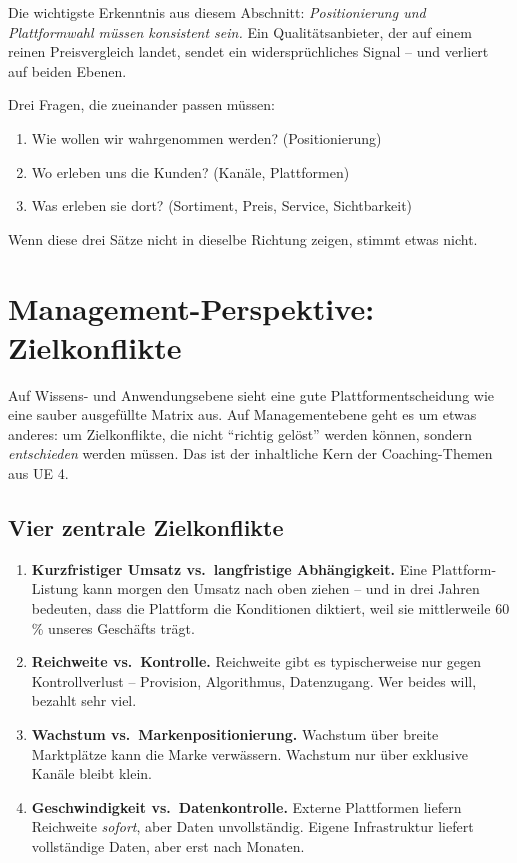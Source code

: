 \documentclass[11pt,a4paper,oneside]{article}
\begin{document}
Die wichtigste Erkenntnis aus diesem Abschnitt: \emph{Positionierung und Plattformwahl müssen konsistent sein.} Ein Qualitätsanbieter, der auf einem reinen Preisvergleich landet, sendet ein widersprüchliches Signal -- und verliert auf beiden Ebenen.

\begin{merkbox}
Drei Fragen, die zueinander passen müssen:
\begin{enumerate}
  \item Wie wollen wir wahrgenommen werden? (Positionierung)
  \item Wo erleben uns die Kunden? (Kanäle, Plattformen)
  \item Was erleben sie dort? (Sortiment, Preis, Service, Sichtbarkeit)
\end{enumerate}
Wenn diese drei Sätze nicht in dieselbe Richtung zeigen, stimmt etwas nicht.
\end{merkbox}

\section{Management-Perspektive: Zielkonflikte}

Auf Wissens- und Anwendungsebene sieht eine gute Plattformentscheidung wie eine sauber ausgefüllte Matrix aus. Auf Managementebene geht es um etwas anderes: um Zielkonflikte, die nicht ``richtig gelöst'' werden können, sondern \emph{entschieden} werden müssen. Das ist der inhaltliche Kern der Coaching-Themen aus UE 4.

\subsection{Vier zentrale Zielkonflikte}

\begin{enumerate}
  \item \textbf{Kurzfristiger Umsatz vs.\ langfristige Abhängigkeit.} Eine Plattform-Listung kann morgen den Umsatz nach oben ziehen -- und in drei Jahren bedeuten, dass die Plattform die Konditionen diktiert, weil sie mittlerweile 60\,\% unseres Geschäfts trägt.
  \item \textbf{Reichweite vs.\ Kontrolle.} Reichweite gibt es typischerweise nur gegen Kontrollverlust -- Provision, Algorithmus, Datenzugang. Wer beides will, bezahlt sehr viel.
  \item \textbf{Wachstum vs.\ Markenpositionierung.} Wachstum über breite Marktplätze kann die Marke verwässern. Wachstum nur über exklusive Kanäle bleibt klein.
  \item \textbf{Geschwindigkeit vs.\ Datenkontrolle.} Externe Plattformen liefern Reichweite \emph{sofort}, aber Daten unvollständig. Eigene Infrastruktur liefert vollständige Daten, aber erst nach Monaten.
\end{enumerate}
\end{document}
